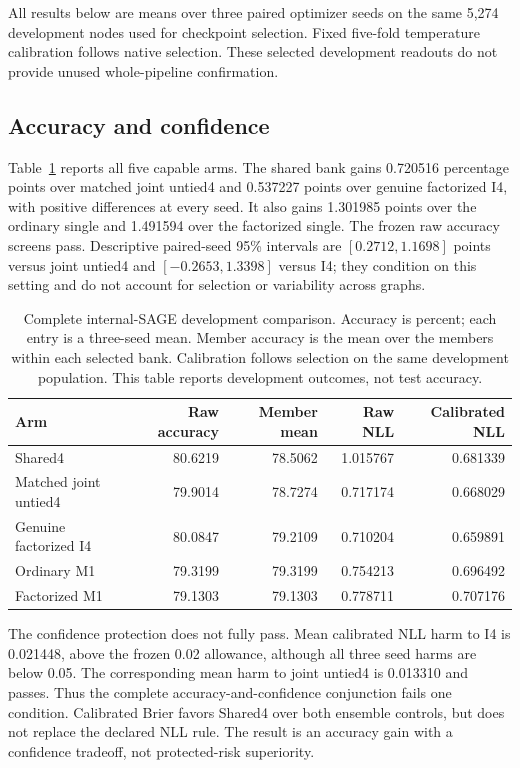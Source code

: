All results below are means over three paired optimizer seeds on the same 5,274 development nodes used for checkpoint selection. Fixed five-fold temperature calibration follows native selection. These selected development readouts do not provide unused whole-pipeline confirmation.

\subsection{Accuracy and confidence}
Table~\ref{tab:internal-sage-F} reports all five capable arms. The shared bank gains 0.720516 percentage points over matched joint untied4 and 0.537227 points over genuine factorized I4, with positive differences at every seed. It also gains 1.301985 points over the ordinary single and 1.491594 over the factorized single. The frozen raw accuracy screens pass. Descriptive paired-seed 95\% intervals are $[0.2712,1.1698]$ points versus joint untied4 and $[-0.2653,1.3398]$ versus I4; they condition on this setting and do not account for selection or variability across graphs.

\begin{table}[t]
\centering\small
\setlength{\tabcolsep}{4pt}
\caption{Complete internal-SAGE development comparison. Accuracy is percent; each entry is a three-seed mean. Member accuracy is the mean over the members within each selected bank. Calibration follows selection on the same development population. This table reports development outcomes, not test accuracy.}
\label{tab:internal-sage-F}
\begin{tabular}{lrrrr}
\toprule
Arm & Raw accuracy & Member mean & Raw NLL & Calibrated NLL\\
\midrule
Shared4 & 80.6219 & 78.5062 & 1.015767 & 0.681339\\
Matched joint untied4 & 79.9014 & 78.7274 & 0.717174 & 0.668029\\
Genuine factorized I4 & 80.0847 & 79.2109 & 0.710204 & 0.659891\\
Ordinary M1 & 79.3199 & 79.3199 & 0.754213 & 0.696492\\
Factorized M1 & 79.1303 & 79.1303 & 0.778711 & 0.707176\\
\bottomrule
\end{tabular}
\end{table}

The confidence protection does not fully pass. Mean calibrated NLL harm to I4 is 0.021448, above the frozen 0.02 allowance, although all three seed harms are below 0.05. The corresponding mean harm to joint untied4 is 0.013310 and passes. Thus the complete accuracy-and-confidence conjunction fails one condition. Calibrated Brier favors Shared4 over both ensemble controls, but does not replace the declared NLL rule. The result is an accuracy gain with a confidence tradeoff, not protected-risk superiority.

